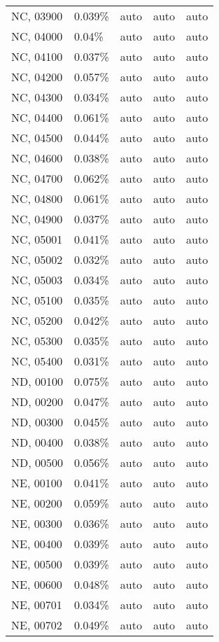 \begin{longtable}[]{@{}lllll@{}}
NC, 03900 & 0.039\% & auto & auto & auto \\
NC, 04000 & 0.04\% & auto & auto & auto \\
NC, 04100 & 0.037\% & auto & auto & auto \\
NC, 04200 & 0.057\% & auto & auto & auto \\
NC, 04300 & 0.034\% & auto & auto & auto \\
NC, 04400 & 0.061\% & auto & auto & auto \\
NC, 04500 & 0.044\% & auto & auto & auto \\
NC, 04600 & 0.038\% & auto & auto & auto \\
NC, 04700 & 0.062\% & auto & auto & auto \\
NC, 04800 & 0.061\% & auto & auto & auto \\
NC, 04900 & 0.037\% & auto & auto & auto \\
NC, 05001 & 0.041\% & auto & auto & auto \\
NC, 05002 & 0.032\% & auto & auto & auto \\
NC, 05003 & 0.034\% & auto & auto & auto \\
NC, 05100 & 0.035\% & auto & auto & auto \\
NC, 05200 & 0.042\% & auto & auto & auto \\
NC, 05300 & 0.035\% & auto & auto & auto \\
NC, 05400 & 0.031\% & auto & auto & auto \\
ND, 00100 & 0.075\% & auto & auto & auto \\
ND, 00200 & 0.047\% & auto & auto & auto \\
ND, 00300 & 0.045\% & auto & auto & auto \\
ND, 00400 & 0.038\% & auto & auto & auto \\
ND, 00500 & 0.056\% & auto & auto & auto \\
NE, 00100 & 0.041\% & auto & auto & auto \\
NE, 00200 & 0.059\% & auto & auto & auto \\
NE, 00300 & 0.036\% & auto & auto & auto \\
NE, 00400 & 0.039\% & auto & auto & auto \\
NE, 00500 & 0.039\% & auto & auto & auto \\
NE, 00600 & 0.048\% & auto & auto & auto \\
NE, 00701 & 0.034\% & auto & auto & auto \\
NE, 00702 & 0.049\% & auto & auto & auto \\

\end{longtable}
